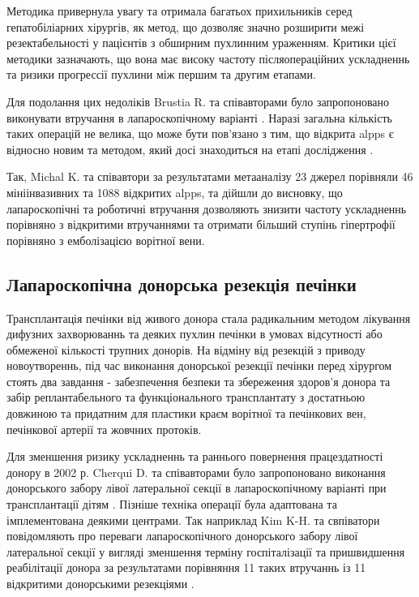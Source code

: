 Методика привернула увагу та отримала багатьох прихильників серед гепатобіліарних хірургів, як метод, що дозволяє значно розширити межі резектабельності у пацієнтів з обширним пухлинним ураженням. Критики цієї методики зазначають, що вона має високу частоту післяопераційних ускладненнь та ризики прогрессії пухлини між першим та другим етапами. 

Для подолання цих недоліків Brustia R. та співавторами було запропоновано виконувати втручання в лапароскопічному варіанті \cite{Brustia2013}. Наразі загальна кількість таких операцій не велика, що може бути пов'язано з тим, що відкрита  \acrshort{alpps} є відносно новим та методом, який досі знаходиться на етапі дослідження \cite{Melandro2019}.

Так, Michal K. та співавтори \cite{Michal2020} за результатами метааналізу 23 джерел порівняли 46 мініінвазивних та 1088 відкритих \acrshort{alpps}, та дійшли до висновку, що лапароскопічні та роботичні втручання дозволяють знизити частоту ускладненнь порівняно з відкритими втручаннями та отримати більший ступінь гіпертрофії порівняно з емболізацією ворітної вени. 

\subsection{Лапароскопічна донорська резекція печінки} 

Трансплантація печінки від живого донора стала радикальним методом лікування дифузних захворюваннь та деяких пухлин печінки в умовах відсутності або обмеженої кількості трупних донорів. На відміну від резекцій з приводу новоутвореннь, під час виконання донорської резекції печінки перед хірургом стоять два завдання -  забезпечення безпеки та збереження здоров'я донора та забір реплантабельного та функціонального трансплантату з достатньою довжиною та придатним для пластики краєм ворітної та печінкових вен, печінкової артерії та жовчних протоків. 

Для зменшення ризику ускладненнь та раннього повернення працездатності донору в 2002 р. Cherqui D. та співавторами було запропоновано виконання донорського забору лівої латеральної секції в лапароскопічному варіанті при трансплантації дітям \cite{Cherqui2002a}. Пізніше техніка операції була адаптована та імплементована деякими центрами. Так наприклад Kim K-H. та свпіватори повідомляють про переваги лапароскопічного донорського забору лівої латеральної секції у вигляді зменшення терміну госпіталізації та пришвидшення реабілітації донора за результатами порівняння 11 таких втручаннь із 11 відкритими донорськими резекціями \cite{Kim2011}. 

